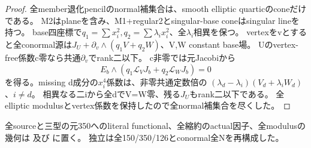 \documentclass[a4paper,11pt]{ltjsarticle}
\theoremstyle{definition}
\begin{document}
\begin{proof}
全member退化pencilのnormal補集合は、smooth elliptic quarticのconeだけである。
M2はplaneを含み、M1+regular2とsingular-base coneはsingular lineを持つ。
base四座標で$q_1=\sum x_i^2,q_2=\sum\lambda_ix_i^2$、全$\lambda_i$相異を保つ。
vertexをvとすると全conormal源は$J_U+\partial_v\wedge(q_1V+q_2W)$、V,W constant base場。
Uのvertex-free係数c零なら共通$\partial_v$でrank二以下。
c非零では元Jacobiから
\[
 E_b\wedge(q_1\mathcal L_VJ_b+q_2\mathcal L_WJ_b)=0
\]
を得る。missing d成分の$x_i^4$係数は、非零共通定数倍の
$(\lambda_d-\lambda_i)(V_d+\lambda_iW_d)$、$i\ne d$。
相異なる二iから全dでV=W零、残る$J_U$もrank二以下である。
全elliptic modulusとvertex係数を保持したので全normal補集合を尽くした。
\end{proof}
全sourceと三型の元350へのliteral functional、全縮約のactual因子、全modulusの幾何は
及び
に置く。
独立は全150/350/126とconormal全Nを再構成した。
\end{document}
